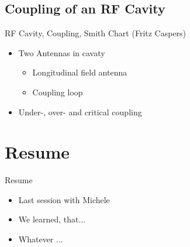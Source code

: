 \documentclass{beamer}
\begin{document}
\subsection{Coupling of an RF Cavity}
\begin{frame}[t,fragile]{RF Cavity, Coupling, Smith Chart (Fritz Caspers)}
\begin{itemize}
\item  Two Antennas in cavaty
\begin{itemize}
\item Longitudinal field antenna
\item Coupling loop
\end{itemize}
\item Under-, over- and critical coupling
\end{itemize}
\begin{figure}
  \centering\setcounter{subfigure}{0}
  \;
  \;
\end{figure}
\end{frame}

\section{Resume}
\begin{frame}[t,fragile]{Resume}
\begin{itemize}
\item Last session with Michele
\item We learned, that...
\item Whatever ...
\end{itemize}
\end{frame}
\end{document}
